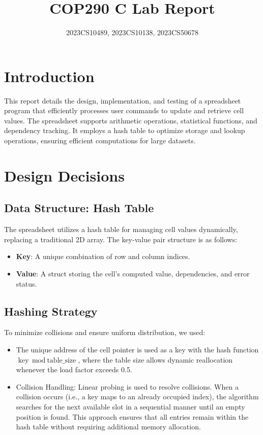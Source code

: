 \documentclass[a4paper,12pt]{article}
\title{\vspace{-1cm}COP290 C Lab Report} %
\author{2023CS10489, 2023CS10138, 2023CS50678}
\date{}
\begin{document}
\maketitle

\section{Introduction}
This report details the design, implementation, and testing of a spreadsheet program that efficiently processes user commands to update and retrieve cell values. The spreadsheet supports arithmetic operations, statistical functions, and dependency tracking. It employs a hash table to optimize storage and lookup operations, ensuring efficient computations for large datasets.

\section{Design Decisions}
\subsection{Data Structure: Hash Table}
The spreadsheet utilizes a hash table for managing cell values dynamically, replacing a traditional 2D array. The key-value pair structure is as follows:
\begin{itemize}
    \item \textbf{Key}: A unique combination of row and column indices.
    \item \textbf{Value}: A struct storing the cell’s computed value, dependencies, and error status.
\end{itemize}

\subsection{Hashing Strategy}
To minimize collisions and ensure uniform distribution, we used:
\begin{itemize}
    \item The unique address of the cell pointer is used as a key with the hash function \(\text{key} \mod \text{table\_size}\), where the table size allows dynamic reallocation whenever the load factor exceeds 0.5.

    \item Collision Handling: Linear probing is used to resolve collisions. When a collision occurs (i.e., a key maps to an already occupied index), the algorithm searches for the next available slot in a sequential manner until an empty position is found. This approach ensures that all entries remain within the hash table without requiring additional memory allocation.
\end{itemize}
\end{document}
